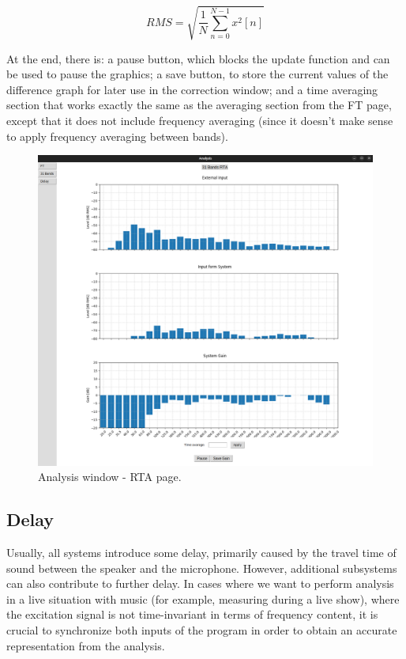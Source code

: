 \begin{equation}
	\label{eq:RMS}
	RMS = \sqrt{ \frac{1}{N} \sum_{n=0}^{N-1} x^2[n] }
\end{equation}

At the end, there is: a pause button, which blocks the update function and can be used to pause the graphics; a save button, to store the current values of the difference graph for later use in the correction window; and a time averaging section that works exactly the same as the averaging section from the FT page, except that it does not include frequency averaging (since it doesn't make sense to apply frequency averaging between bands).

\begin{figure}[H]
	\centering
	\includegraphics[width=1
	\linewidth]{Figures/RTA_page.png}
	\caption{Analysis window - RTA page.}
	\label{fig:RTA_page}
\end{figure}


\subsection{Delay}

Usually, all systems introduce some delay, primarily caused by the travel time of sound between the speaker and the microphone. However, additional subsystems can also contribute to further delay. In cases where we want to perform analysis in a live situation with music (for example, measuring during a live show), where the excitation signal is not time-invariant in terms of frequency content, it is crucial to synchronize both inputs of the program in order to obtain an accurate representation from the analysis.

